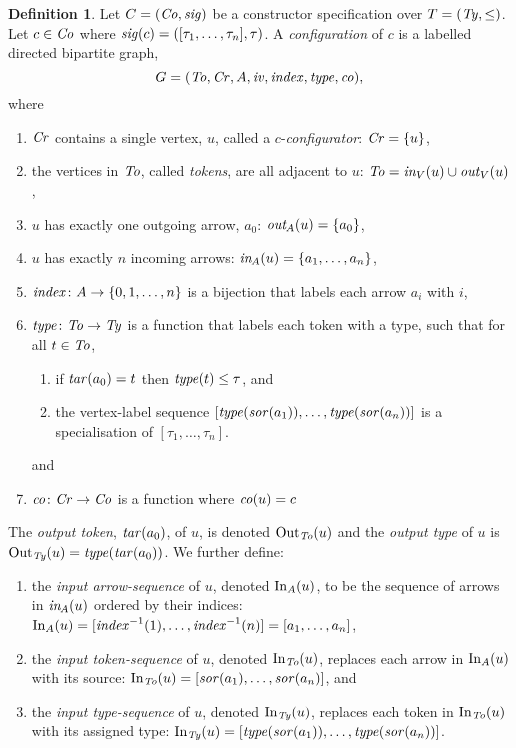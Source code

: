 \documentclass[a4paper]{article}
\theoremstyle{definition}
\newtheorem{definition}{Definition}
\begin{document}
	\begin{definition}\label{defn:configuration}
		Let $C=(\mathit{Co}, \mathit{sig})$ be a constructor specification over $T=(\mathit{Ty},\leq)$. Let $c\in \mathit{Co}$ where
		$\mathit{sig}(c) =([\tau_1,\ldots,\tau_n], \tau)$.  A \textit{configuration} of $c$ is a labelled directed bipartite graph, $$G=(\mathit{To},\mathit{Cr},A,\mathit{iv}, \mathit{index},\mathit{type},\mathit{co}),$$ where
		\begin{enumerate}[itemsep=0pt,topsep=4pt]
			\item $\mathit{Cr}$ contains a single vertex, $u$, called a $c$-\textit{configurator}: $\mathit{Cr}=\{u\}$,
			\item the vertices in $\mathit{To}$, called \textit{tokens}, are all adjacent to $u$: $\mathit{To}=\mathit{in}_{\hspace{-0.02em}V}(u)\cup \mathit{out}_{\hspace{-0.02em}V}(u)$,
			\item $u$ has exactly one outgoing arrow, $a_{0}$: $\mathit{out}_{\hspace{-0.084em}A}(u)=\{a_{0}\}$,
			\item $u$ has exactly $n$ incoming arrows: $\mathit{in}_{\hspace{-0.084em}A}(u)=\{a_1,\ldots,a_n\}$,
			\item $\mathit{index}\colon A\to \{0,1,\ldots,n\}$ is a bijection that labels each arrow $a_{i}$ with $i$,
			\item $\mathit{type}\colon \mathit{To} \to \mathit{Ty}$ is a function that labels each token with a type, such that for all $t\in \mathit{To}$,
			\begin{enumerate}[itemsep=0pt,topsep=2pt]
				\item if $\mathit{tar}(a_{0})=t$  then $\mathit{type}(t)\leq \tau$, and
				\item the vertex-label sequence $[\mathit{type}(\mathit{sor}(a_1)),\ldots,\mathit{type}(\mathit{sor}(a_n))]$ is a specialisation of $[\tau_1,\ldots,\tau_n]$.
			\end{enumerate}
			and
			\item $\mathit{co}\colon \mathit{Cr} \to \mathit{Co}$ is a function where $\mathit{co}(u)=c$

		\end{enumerate}
		The \textit{output token}, $\mathit{tar}(a_0)$, of $u$, is denoted $\operatorname{Out}_{\mathit{To}}({u})$ and the \textit{output type} of $u$ is $\operatorname{Out}_{\mathit{Ty}}({u})=\mathit{type}(\mathit{tar}(a_0))$. We further define:
		\begin{enumerate}[itemsep=0pt,topsep=4pt]
			\item the \textit{input arrow-sequence} of $u$, denoted $\operatorname{In}_A({u})$, to be the sequence of arrows in $\mathit{in}_{\hspace{-0.084em}A}(u)$ ordered by their indices: $\operatorname{In}_A({u}) = [\mathit{index}^{-1}(1),\ldots,\mathit{index}^{-1}(n)] = [a_1,\ldots,a_n]$,
			\item the \textit{input token-sequence} of $u$, denoted $\operatorname{In}_{\mathit{To}}({u})$, replaces each arrow in $\operatorname{In}_A({u})$ with its source: $\operatorname{In}_{\mathit{To}}({u}) = [\mathit{sor}(a_1),\ldots,\mathit{sor}(a_n)]$, and
			\item the \textit{input type-sequence} of $u$, denoted $\operatorname{In}_{\mathit{Ty}}({u})$, replaces each token in $\operatorname{In}_{\mathit{To}}({u})$ with its assigned type: $\operatorname{In}_{\mathit{Ty}}({u}) = [\mathit{type}(\mathit{sor}(a_1)),\ldots,\mathit{type}(\mathit{sor}(a_n))]$.
		\end{enumerate}
	\end{definition}
\end{document}
